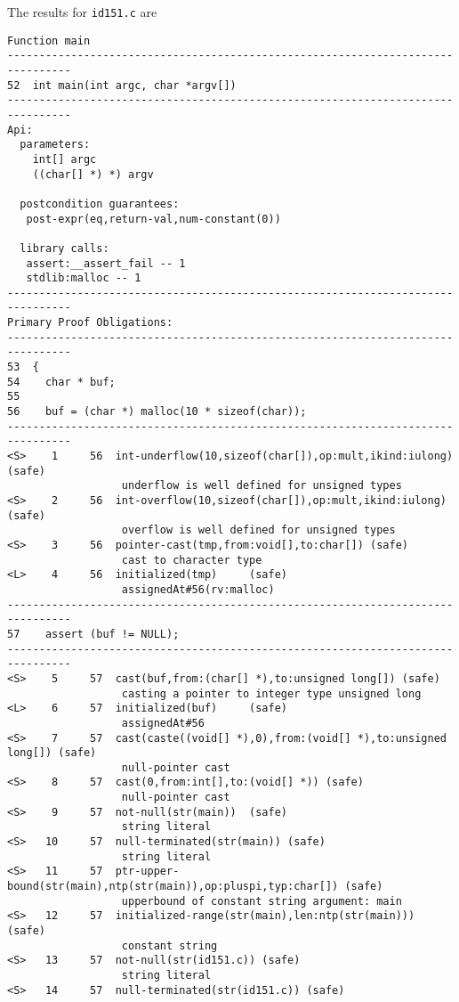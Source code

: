 \documentclass[11pt]{article}
\begin{document}
The results for {\tt id151.c} are
\begin{scriptsize}
\begin{verbatim}
Function main
--------------------------------------------------------------------------------
52  int main(int argc, char *argv[])
--------------------------------------------------------------------------------
Api:
  parameters:
    int[] argc
    ((char[] *) *) argv

  postcondition guarantees:
   post-expr(eq,return-val,num-constant(0))

  library calls:
   assert:__assert_fail -- 1
   stdlib:malloc -- 1
--------------------------------------------------------------------------------
Primary Proof Obligations:
--------------------------------------------------------------------------------
53  {
54    char * buf;
55
56    buf = (char *) malloc(10 * sizeof(char));
--------------------------------------------------------------------------------
<S>    1     56  int-underflow(10,sizeof(char[]),op:mult,ikind:iulong) (safe)
                  underflow is well defined for unsigned types
<S>    2     56  int-overflow(10,sizeof(char[]),op:mult,ikind:iulong) (safe)
                  overflow is well defined for unsigned types
<S>    3     56  pointer-cast(tmp,from:void[],to:char[]) (safe)
                  cast to character type
<L>    4     56  initialized(tmp)     (safe)
                  assignedAt#56(rv:malloc)
--------------------------------------------------------------------------------
57    assert (buf != NULL);
--------------------------------------------------------------------------------
<S>    5     57  cast(buf,from:(char[] *),to:unsigned long[]) (safe)
                  casting a pointer to integer type unsigned long
<L>    6     57  initialized(buf)     (safe)
                  assignedAt#56
<S>    7     57  cast(caste((void[] *),0),from:(void[] *),to:unsigned long[]) (safe)
                  null-pointer cast
<S>    8     57  cast(0,from:int[],to:(void[] *)) (safe)
                  null-pointer cast
<S>    9     57  not-null(str(main))  (safe)
                  string literal
<S>   10     57  null-terminated(str(main)) (safe)
                  string literal
<S>   11     57  ptr-upper-bound(str(main),ntp(str(main)),op:pluspi,typ:char[]) (safe)
                  upperbound of constant string argument: main
<S>   12     57  initialized-range(str(main),len:ntp(str(main))) (safe)
                  constant string
<S>   13     57  not-null(str(id151.c)) (safe)
                  string literal
<S>   14     57  null-terminated(str(id151.c)) (safe)

\end{verbatim}
\end{scriptsize}
\end{document}
